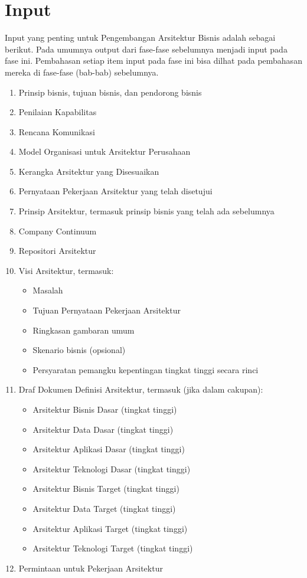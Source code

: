 \section{Input}
Input yang penting untuk Pengembangan Arsitektur Bisnis adalah sebagai berikut. Pada umumnya output dari fase-fase sebelumnya menjadi input pada fase ini. Pembahasan setiap item input pada fase ini bisa dilhat pada pembahasan mereka di fase-fase (bab-bab) sebelumnya.
\begin{enumerate}
	\item Prinsip bisnis, tujuan bisnis, dan pendorong bisnis
	\item Penilaian Kapabilitas
	\item Rencana Komunikasi
	\item Model Organisasi untuk Arsitektur Perusahaan
	\item Kerangka Arsitektur yang Disesuaikan
	\item Pernyataan Pekerjaan Arsitektur yang telah disetujui
	\item Prinsip Arsitektur, termasuk prinsip bisnis yang telah ada sebelumnya
	\item Company Continuum
	\item Repositori Arsitektur
	\item Visi Arsitektur, termasuk:
	\begin{itemize}
		\item Masalah
		\item Tujuan Pernyataan Pekerjaan Arsitektur
		\item Ringkasan gambaran umum
		\item Skenario bisnis (opsional)
		\item Persyaratan pemangku kepentingan tingkat tinggi secara rinci
	\end{itemize}
	\item Draf Dokumen Definisi Arsitektur, termasuk (jika dalam cakupan):
	\begin{itemize}
		\item Arsitektur Bisnis Dasar (tingkat tinggi)
		\item Arsitektur Data Dasar (tingkat tinggi)
		\item Arsitektur Aplikasi Dasar (tingkat tinggi)
		\item Arsitektur Teknologi Dasar (tingkat tinggi)
		\item Arsitektur Bisnis Target (tingkat tinggi)
		\item Arsitektur Data Target (tingkat tinggi)
		\item Arsitektur Aplikasi Target (tingkat tinggi)
		\item Arsitektur Teknologi Target (tingkat tinggi)
	\end{itemize}
	\item Permintaan untuk Pekerjaan Arsitektur
\end{enumerate}

